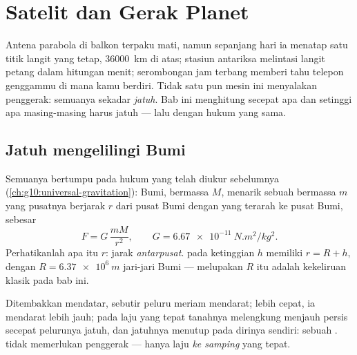 \chapter{Satelit dan Gerak Planet}\label{ch:g12:satellites-kepler}

Antena parabola di balkon terpaku mati, namun sepanjang hari ia menatap satu
titik langit yang tetap, \qty{36000}{km} di atas; stasiun antariksa
melintasi langit petang dalam hitungan menit; serombongan jam terbang
memberi tahu telepon genggammu di mana kamu berdiri. Tidak satu pun mesin
ini menyalakan penggerak: semuanya sekadar \emph{jatuh}. Bab ini menghitung
secepat apa dan setinggi apa masing-masing harus jatuh --- lalu  dengan hukum yang sama.

\section{Jatuh mengelilingi Bumi}

Semuanya bertumpu pada hukum yang telah diukur sebelumnya
(\cref{ch:g10:universal-gravitation}): Bumi, bermassa $M$, menarik sebuah
 bermassa $m$ yang pusatnya berjarak $r$ dari pusat Bumi dengan 
yang terarah ke pusat Bumi, sebesar
\[ F = G\,\frac{m M}{r^2}, \qquad G = \qty{6.67e-11}{N.m^2/kg^2}. \]
Perhatikanlah apa itu $r$: jarak \emph{antarpusat}.  pada ketinggian
$h$ memiliki $r = R + h$, dengan $R = \qty{6.37e6}{m}$ jari-jari Bumi ---
melupakan $R$ itu adalah kekeliruan klasik pada bab ini.

\begin{remark}\label{rem:g12:satellites-kepler:cannon}
Ditembakkan mendatar, sebutir peluru meriam mendarat; lebih cepat, ia
mendarat lebih jauh; pada laju yang tepat tanahnya melengkung menjauh persis
secepat pelurunya jatuh, dan jatuhnya menutup pada dirinya sendiri: sebuah
.  tidak memerlukan penggerak --- hanya laju \emph{ke samping}
yang tepat.
\end{remark}

